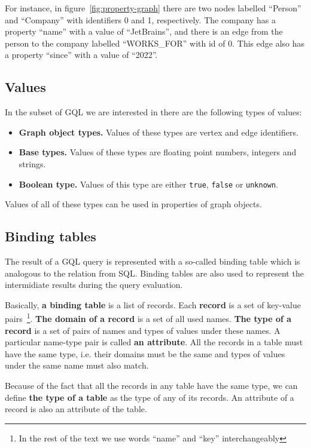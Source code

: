 \documentclass[14pt]{constructor-thesis}
\begin{document}
For instance, in figure~\ref{fig:property-graph} there are two nodes labelled ``Person'' and ``Company'' with identifiers 0 and 1, respectively. The company has a property ``name'' with a value of ``JetBrains'', and there is an edge from the person to the company labelled ``WORKS\_FOR'' with id of 0. This edge also has a property ``since'' with a value of ``2022''.

\subsection{Values}

In the subset of GQL we are interested in there are the following types of values:
\begin{itemize}
  \item \textbf{Graph object types.} Values of these types are vertex and edge identifiers.
  \item \textbf{Base types.} Values of these types are floating point numbers, integers and strings. 
  \item \textbf{Boolean type.} Values of this type are either \texttt{true}, \texttt{false} or \texttt{unknown}.
\end{itemize}

Values of all of these types can be used in properties of graph objects.

\subsection{Binding tables}

The result of a GQL query is represented with a so-called binding table which is analogous to the relation from SQL. Binding tables are also used to represent the intermidiate results during the query evaluation.

Basically, \textbf{a binding table} is a list of records. Each \textbf{record} is a set of key-value pairs~\footnote{In the rest of the text we use words ``name'' and ``key'' interchangeably}. \textbf{The domain of a record} is a set of all used names. \textbf{The type of a record}  is a set of pairs of names and types of values under these names. A particular name-type pair is called \textbf{an attribute}. All the records in a table must have the same type, i.e. their domains must be the same and types of values under the same name must also match.

Because of the fact that all the records in any table have the same type, we can define \textbf{the type of a table} as the type of any of its records. An attribute of a record is also an attribute of the table.
\end{document}
